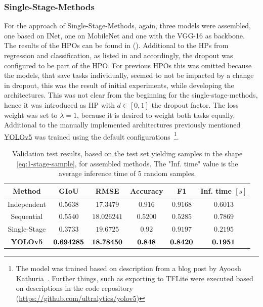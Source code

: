 \subsubsection{Single-Stage-Methods}
For the approach of Single-Stage-Methods, again, three models were assembled, one based on INet, one on MobileNet and one with the VGG-16 as backbone.
The results of the HPOs can be found in  ().
Additional to the HPs from regression and classification, as listed in  and  accordingly, the dropout was configured to be part of the HPO.
For previous HPOs this was omitted because the models, that save tasks individually, seemed to not be impacted by a change in dropout, this was the result of initial experiments, while developing the architectures.
This was not clear from the beginning for the single-stage-methods, hence it was introduced as HP with $d\in[0,1]$ the dropout factor.
The loss weight was set to $\lambda=1$, because it is desired to weight both tasks equally.
Additional to the manually implemented architectures previously mentioned \href{https://github.com/ultralytics/yolov5}{YOLOv5} was trained using the default configurations~\footnote{
    The model was trained based on description from a blog post by Ayoosh Kathuria~\cite{yolo-blog}.
    Further things, such as exporting to TFLite were executed based on descriptions in the code repository (\url{https://github.com/ultralytics/yolov5})
}.
\begin{table}
    \centering
    \begin{tabular}{|c|c|c|c|c|c|}
    \hline
        \textbf{Method} & \textbf{GIoU} & \textbf{RMSE} & \textbf{Accuracy} & \textbf{F1} & \textbf{Inf. time $[s]$} \\
        \hline
        Independent & $0.5638$ &
$17.3479$ & $0.916$ & $0.9168$ & $0.6013$\\
        \hline
        Sequential & $0.5540$ & $18.026241$ & $0.5200$ & $0.5285$ & $0.7869$\\
        \hline
        Single-Stage & $0.3733$
& $19.6725$ & $0.92$ & $0.9197$ & $0.2195$\\
        \hline
        \hline
        \textbf{YOLOv5}
        & $\bm{0.694285}$
        & $\bm{18.78450}$
        & $\bm{0.848}$
        & $\bm{0.8420}$
        & $\bm{0.1951}$\\
        \hline
    \end{tabular}
    \caption{Validation test results, based on the test set yielding samples in the shape \eqref{eq:1-stage-sample}, for assembled methods.
    The "Inf. time" value is the average inference time of 5 random samples\footnotemark.}
    \label{fig:final-results}
\end{table}
